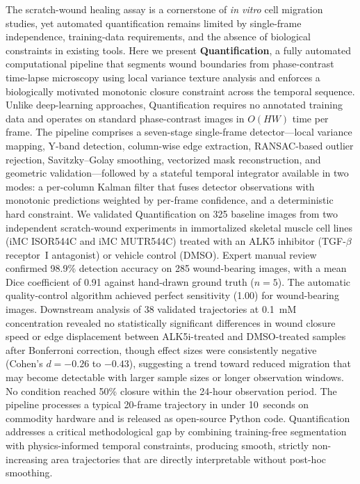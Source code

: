 The scratch-wound healing assay is a cornerstone of \textit{in vitro} cell migration studies, yet automated quantification remains limited by single-frame independence, training-data requirements, and the absence of biological constraints in existing tools. Here we present \textbf{Quantification}, a fully automated computational pipeline that segments wound boundaries from phase-contrast time-lapse microscopy using local variance texture analysis and enforces a biologically motivated monotonic closure constraint across the temporal sequence. Unlike deep-learning approaches, Quantification requires no annotated training data and operates on standard phase-contrast images in $O(HW)$ time per frame. The pipeline comprises a seven-stage single-frame detector---local variance mapping, Y-band detection, column-wise edge extraction, RANSAC-based outlier rejection, Savitzky--Golay smoothing, vectorized mask reconstruction, and geometric validation---followed by a stateful temporal integrator available in two modes: a per-column Kalman filter that fuses detector observations with monotonic predictions weighted by per-frame confidence, and a deterministic hard constraint. We validated Quantification on 325 baseline images from two independent scratch-wound experiments in immortalized skeletal muscle cell lines (iMC ISOR544C and iMC MUTR544C) treated with an ALK5 inhibitor (TGF-$\beta$ receptor~I antagonist) or vehicle control (DMSO). Expert manual review confirmed 98.9\% detection accuracy on 285 wound-bearing images, with a mean Dice coefficient of 0.91 against hand-drawn ground truth ($n = 5$). The automatic quality-control algorithm achieved perfect sensitivity (1.00) for wound-bearing images. Downstream analysis of 38 validated trajectories at 0.1~mM concentration revealed no statistically significant differences in wound closure speed or edge displacement between ALK5i-treated and DMSO-treated samples after Bonferroni correction, though effect sizes were consistently negative (Cohen's $d = -0.26$ to $-0.43$), suggesting a trend toward reduced migration that may become detectable with larger sample sizes or longer observation windows. No condition reached 50\% closure within the 24-hour observation period. The pipeline processes a typical 20-frame trajectory in under 10~seconds on commodity hardware and is released as open-source Python code. Quantification addresses a critical methodological gap by combining training-free segmentation with physics-informed temporal constraints, producing smooth, strictly non-increasing area trajectories that are directly interpretable without post-hoc smoothing.
